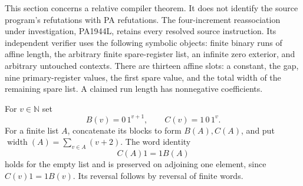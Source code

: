 This section concerns a relative compiler theorem. It does not identify the
source program's refutations with PA refutations. The four-increment
reassociation under investigation, PA1944L, retains every resolved source
instruction. Its independent verifier uses the following symbolic objects:
finite binary runs of affine length, the arbitrary finite spare-register
list, an infinite zero exterior, and arbitrary untouched contexts. There
are thirteen affine slots: a constant, the gap, nine primary-register
values, the first spare value, and the total width of the remaining spare
list. A claimed run length has nonnegative coefficients.

For $v\in\mathbb N$ set
\[
 B(v)=0\,1^{v+1},\qquad C(v)=1\,0\,1^v.
\]
For a finite list $A$, concatenate its blocks to form $B(A),C(A)$, and put
$\operatorname{width}(A)=\sum_{v\in A}(v+2)$. The word identity
\[
 C(A)1=1B(A)
\]
holds for the empty list and is preserved on adjoining one element, since
$C(v)1=1B(v)$. Its reversal follows by reversal of finite words.

